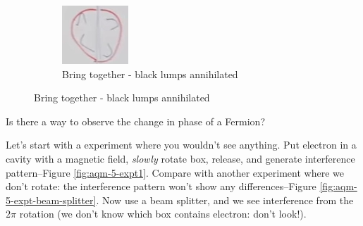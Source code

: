 \documentclass[]{article}
\begin{document}
\begin{figure}[H]
\begin{subfigure}{0.3\textwidth}
	\end{subfigure}
	\begin{subfigure}{0.3\textwidth}
		\caption{Bring together - black lumps annihilated}
		\includegraphics[width=\textwidth]{aqm-5-partially-annihilated}
	\end{subfigure}
\end{figure}

Is there a way to observe the change in phase of a Fermion?

Let's start with a experiment where you wouldn't see anything. Put electron in a cavity with a magnetic field, \emph{slowly} rotate box, release, and generate interference pattern--Figure \ref{fig:aqm-5-expt1}. Compare with another experiment where we don't rotate: the interference pattern won't show any differences--Figure \ref{fig:aqm-5-expt-beam-splitter}. Now use a beam splitter, and we see interference from the $2\pi$ rotation (we don't know which box contains electron: don't look!).
\end{document}
